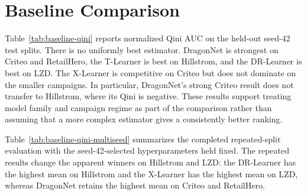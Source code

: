 \documentclass[twocolumn]{style}
\begin{document}
\section{Baseline Comparison}
\label{sec:baseline-results}
Table~\ref{tab:baseline-qini} reports normalized Qini AUC on the held-out seed-42 test splits. There
is no uniformly best estimator. DragonNet is strongest on Criteo and RetailHero, the T-Learner is
best on Hillstrom, and the DR-Learner is best on LZD. The X-Learner is competitive on Criteo but does
not dominate on the smaller campaigns. In particular, DragonNet's strong Criteo result does not
transfer to Hillstrom, where its Qini is negative. These results support treating model family and
campaign regime as part of the comparison rather than assuming that a more complex estimator gives
a consistently better ranking.

\begin{table}[!htpb]
    \caption{Normalized Qini AUC on the held-out test split (seed 42). Higher is better; the best
    result in each dataset is bold.}
    \label{tab:baseline-qini}
    \centering
    \small
\end{table}

Table~\ref{tab:baseline-qini-multiseed} summarizes the completed repeated-split evaluation with the
seed-42-selected hyperparameters held fixed. The repeated results change the apparent winners on
Hillstrom and LZD: the DR-Learner has the highest mean on Hillstrom and the X-Learner has the
highest mean on LZD, whereas DragonNet retains the highest mean on Criteo and RetailHero.
\end{document}
